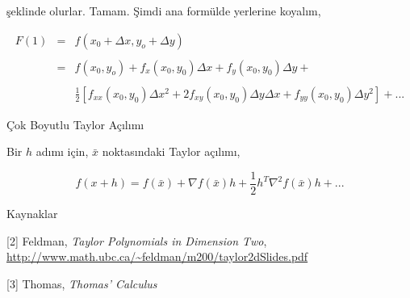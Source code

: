 \documentclass[12pt,fleqn]{article}\usepackage{../../common}
\begin{document}
şeklinde olurlar. Tamam. Şimdi ana formülde yerlerine koyalım,

$$ 
\begin{array}{lll}
F(1) &=&  f(x_0 +\Delta x, y_o + \Delta y)  \\ \\
&=& f(x_0 , y_o) +  f_x(x_0,y_0) \Delta x + f_y(x_0,y_0) \Delta y +   \\ \\
&& \frac{1}{2} 
[ 
f_{xx}(x_0,y_0)\Delta x^2 + 
2f_{xy}(x_0,y_0)\Delta y \Delta x +
f_{yy}(x_0,y_0)\Delta y^2 
] + ... 
\end{array}
 $$

Çok Boyutlu Taylor Açılımı

Bir $h$ adımı için, $\bar{x}$ noktasındaki Taylor açılımı,

$$
f(x + h) = 
f(\bar{x}) + \nabla f(\bar{x}) h + 
\frac{1}{2} h^T \nabla^2f(\bar{x}) h +  ...
$$


Kaynaklar

[2] Feldman, {\em Taylor Polynomials in Dimension Two},
\url{http://www.math.ubc.ca/~feldman/m200/taylor2dSlides.pdf}

[3] Thomas, {\em Thomas' Calculus}
\end{document}
